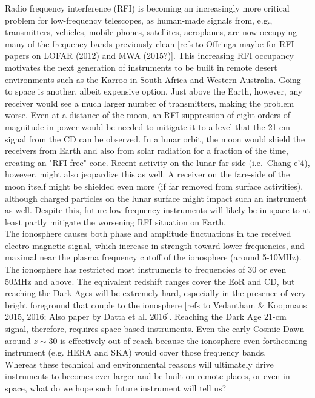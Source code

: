  Radio frequency interference (RFI) is becoming an increasingly more critical problem for low-frequency telescopes, as human-made signals from, e.g., transmitters, vehicles, mobile phones, satellites, aeroplanes, are now occupying many of the frequency bands previously clean [refs to Offringa maybe for RFI papers on LOFAR (2012) and MWA (2015?)]. This increasing RFI occupancy motivates the next generation of instruments to be built in remote desert environments such as the Karroo in South Africa and Western Australia. Going to space is another, albeit expensive option. Just above the Earth, however, any receiver would see a much larger number of transmitters, making the problem worse. Even at a distance of the moon, an RFI suppression of eight orders of magnitude in power would be needed to mitigate it to a level that the 21-cm signal from the CD can be observed. In a lunar orbit, the moon would shield the receivers from Earth and also from solar radiation for a fraction of the time, creating an "RFI-free" cone. Recent activity on the lunar far-side (i.e.\ Chang-e'4), however, might also jeopardize this as well. A receiver on the fare-side of the moon itself might be shielded even more (if far removed from surface activities), although charged particles on the lunar surface might impact such an instrument as well. Despite this, future low-frequency instruments will likely be in space to at least partly mitigate the worsening RFI situation on Earth. \\

 The ionosphere causes both phase and amplitude fluctuations in the received electro-magnetic signal, which increase in strength toward lower frequencies, and maximal near the plasma frequency cutoff of the ionosphere (around 5-10MHz). The ionosphere has restricted most instruments to frequencies of 30 or even 50MHz and above. The equivalent redshift ranges cover the EoR and CD, but reaching the Dark Ages will be extremely hard, especially in the presence of very bright foreground that couple to the ionosphere [refs to Vedantham \& Koopmans 2015, 2016; Also paper by Datta et al. 2016]. Reaching the Dark Age 21-cm signal, therefore, requires space-based instruments. Even the early Cosmic Dawn around $z\sim 30$ is effectively out of reach because the ionosphere even forthcoming instrument (e.g. HERA and SKA) would cover those frequency bands.\\

\noindent Whereas these technical and environmental reasons will ultimately drive instruments to becomes ever larger and be built on remote places, or even in space, what do we hope such future instrument will tell us?


